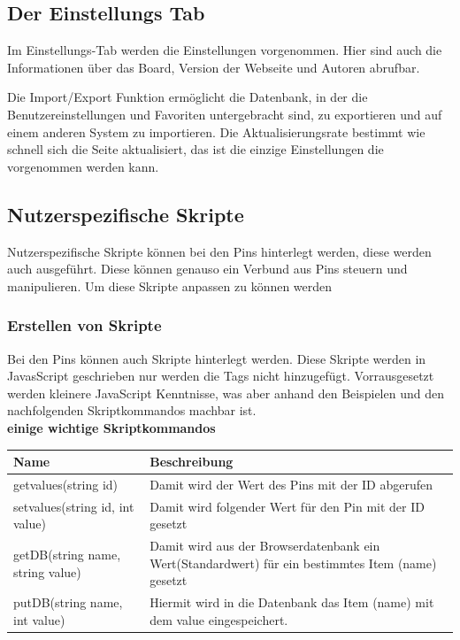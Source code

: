\subsection{Der Einstellungs Tab}
Im Einstellungs-Tab werden die Einstellungen vorgenommen. Hier sind auch die
Informationen über das Board, Version der Webseite und Autoren abrufbar.

Die Import/Export Funktion ermöglicht die Datenbank, in der die
Benutzereinstellungen und Favoriten untergebracht sind, zu exportieren und auf einem anderen System zu
importieren. Die Aktualisierungsrate bestimmt wie schnell sich die Seite
aktualisiert, das ist die einzige Einstellungen die vorgenommen werden kann.

\subsection{Nutzerspezifische Skripte}
Nutzerspezifische Skripte können bei den Pins hinterlegt werden, diese werden
auch ausgeführt. Diese können genauso ein Verbund aus Pins steuern und
manipulieren. Um diese Skripte anpassen zu können werden

\subsubsection{Erstellen von Skripte}
Bei den Pins können auch Skripte hinterlegt werden. Diese Skripte werden in
JavasScript geschrieben nur werden die Tags nicht hinzugefügt. Vorrausgesetzt
werden kleinere JavaScript Kenntnisse, was aber anhand den Beispielen und den
nachfolgenden Skriptkommandos machbar ist.\\

\textbf{einige wichtige Skriptkommandos}\\\newline
\begin{tabular}{|l|l|}\hline
\textbf{Name} & \textbf{Beschreibung}\\\hline\hline
getvalues(string id) & Damit wird der Wert des Pins mit der ID abgerufen\\\hline
setvalues(string id, int value) & Damit wird folgender Wert für den Pin mit der
ID gesetzt\\\hline
getDB(string name, string value) & Damit wird aus der Browserdatenbank
ein Wert(Standardwert) für ein bestimmtes Item (name) gesetzt\\\hline 
putDB(string name, int value) & Hiermit wird in die Datenbank das Item (name)
mit dem value eingespeichert.\\\hline
\end{tabular}

